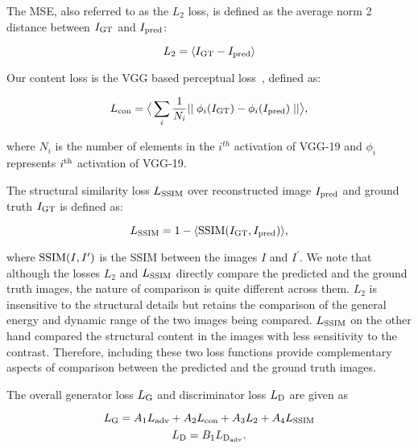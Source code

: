 \documentclass[runningheads]{llncs}
\begin{document}
The MSE, also referred to as the $L_2$ loss, is defined as the average norm 2 distance between $I_{\rm{GT}}$ and $I_{\rm{pred}}$:

\begin{equation}
L_2= \langle{I_{\rm{GT}}-I_{\rm{pred}}}\rangle
    \label{eq:L2}
\end{equation}

Our content loss is the VGG based perceptual loss~\cite{johnson2016perceptual}, defined as:

\begin{equation}
    L_{\rm{con}}= \big\langle\sum_i{\frac{1}{N_i}{\mid\mid \phi_i(I_{\rm GT})-\phi_i(I_{\rm pred})\mid\mid}}\big\rangle,
\end{equation}

\noindent where $N_i$ is the number of elements in the $i^{th}$ activation of VGG-19 and $\phi_i$ represents $i^{\rm{th}}$ activation of VGG-19. 

The structural similarity loss $L_{\rm{SSIM}}$ over reconstructed image $I_{\rm pred}$ and ground truth $I_{\rm GT}$ is defined as:

\begin{equation}
    L_{\rm{SSIM}}= 1 - \langle {{\rm SSIM}(I_{\rm GT},I_{\rm pred})}\rangle,
\end{equation}

\noindent where ${\rm SSIM}(I, I^\prime)$ is the SSIM \cite{wang2004image} between the images $I$ and $I^\prime$. We note that although the losses $L_2$ and $L_{\rm SSIM}$ directly compare the predicted and the ground truth images, the nature of comparison is quite different across them. $L_2$ is insensitive to the structural details but retains the comparison of the general energy and dynamic range of the two images being compared. $L_{\rm SSIM}$ on the other hand compared the structural content in the images with less sensitivity to the contrast. Therefore, including these two loss functions provide complementary aspects of comparison between the predicted and the ground truth images.   

The overall generator loss $L_{\rm{G}}$ and discriminator loss $L_{\rm{D}}$ are given as 

\begin{equation}
    {L_{\rm{G}}=A_1 L_{\rm{{adv}}}+A_2 L_{\rm{con}}+A_3 L_2 + A_4 L_{\rm{SSIM}}} 
\end{equation}
\begin{equation}
{L_{\rm{D}}=B_1 L_{\rm{D_{adv}}}.}
\end{equation}
\end{document}
